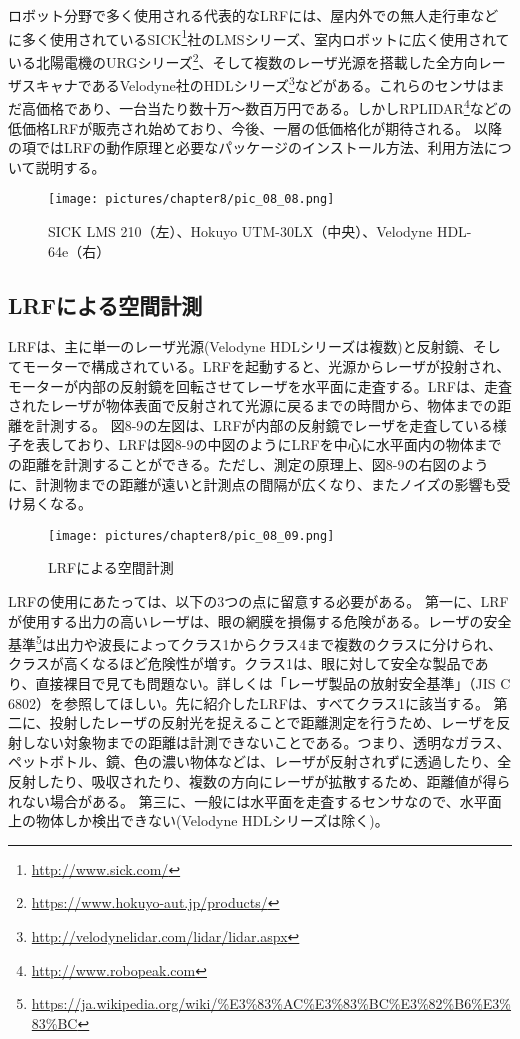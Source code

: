 ロボット分野で多く使用される代表的なLRFには、屋内外での無人走行車などに多く使用されているSICK\footnote{\url{http://www.sick.com/}}社のLMSシリーズ、室内ロボットに広く使用されている北陽電機のURGシリーズ\footnote{\url{https://www.hokuyo-aut.jp/products/}}、そして複数のレーザ光源を搭載した全方向レーザスキャナであるVelodyne社のHDLシリーズ\footnote{\url{http://velodynelidar.com/lidar/lidar.aspx}}などがある。これらのセンサはまだ高価格であり、一台当たり数十万～数百万円である。しかしRPLIDAR\footnote{\url{http://www.robopeak.com}}などの低価格LRFが販売され始めており、今後、一層の低価格化が期待される。
以降の項ではLRFの動作原理と必要なパッケージのインストール方法、利用方法について説明する。

\begin{figure}[htp]
  \centering
  \texttt{[image: pictures/chapter8/pic\_08\_08.png]}
  \caption{SICK LMS 210（左）、Hokuyo UTM-30LX（中央）、Velodyne HDL-64e（右）}
\end{figure}

\subsection{LRFによる空間計測}

LRFは、主に単一のレーザ光源(Velodyne HDLシリーズは複数)と反射鏡、そしてモーターで構成されている。LRFを起動すると、光源からレーザが投射され、モーターが内部の反射鏡を回転させてレーザを水平面に走査する。LRFは、走査されたレーザが物体表面で反射されて光源に戻るまでの時間から、物体までの距離を計測する。
図8-9の左図は、LRFが内部の反射鏡でレーザを走査している様子を表しており、LRFは図8-9の中図のようにLRFを中心に水平面内の物体までの距離を計測することができる。ただし、測定の原理上、図8-9の右図のように、計測物までの距離が遠いと計測点の間隔が広くなり、またノイズの影響も受け易くなる。

\begin{figure}[htp]
  \centering
  \texttt{[image: pictures/chapter8/pic\_08\_09.png]}
  \caption{LRFによる空間計測}
\end{figure}

LRFの使用にあたっては、以下の3つの点に留意する必要がある。
第一に、LRFが使用する出力の高いレーザは、眼の網膜を損傷する危険がある。レーザの安全基準\footnote{\url{https://ja.wikipedia.org/wiki/\%E3\%83\%AC\%E3\%83\%BC\%E3\%82\%B6\%E3\%83\%BC}}は出力や波長によってクラス1からクラス4まで複数のクラスに分けられ、クラスが高くなるほど危険性が増す。クラス1は、眼に対して安全な製品であり、直接裸目で見ても問題ない。詳しくは「レーザ製品の放射安全基準」（JIS C 6802）を参照してほしい。先に紹介したLRFは、すべてクラス1に該当する。
第二に、投射したレーザの反射光を捉えることで距離測定を行うため、レーザを反射しない対象物までの距離は計測できないことである。つまり、透明なガラス、ペットボトル、鏡、色の濃い物体などは、レーザが反射されずに透過したり、全反射したり、吸収されたり、複数の方向にレーザが拡散するため、距離値が得られない場合がある。
第三に、一般には水平面を走査するセンサなので、水平面上の物体しか検出できない(Velodyne HDLシリーズは除く)。

